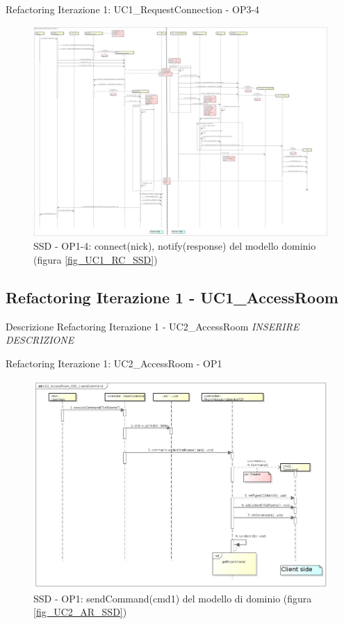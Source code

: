 \documentclass[t]{beamer} %
\begin{document}
\begin{frame} {Refactoring Iterazione 1: UC1\_RequestConnection - OP3-4}
   \begin{figure}
     \includegraphics[scale=0.068]{image_astah/Iteration_1_DesignModel_Refactored/UC1_RequestConnection_SSD_3_4_connect.png}{\centering}
     \caption{SSD - OP1-4: connect(nick), notify(response) del modello dominio (figura \ref{fig_UC1_RC_SSD}) }
     \label{fig_UC1_SSDR_RC_1_4} 
   \end{figure}
\end{frame}

\subsection{Refactoring Iterazione 1 - UC1\_AccessRoom}
\begin{frame} {Descrizione Refactoring Iterazione 1 - UC2\_AccessRoom }
 \emph{INSERIRE DESCRIZIONE}
\end{frame}

\begin{frame} {Refactoring Iterazione 1: UC2\_AccessRoom - OP1}
   \begin{figure}
     \includegraphics[scale=0.21]{image_astah/Iteration_1_DesignModel_Refactored/UC2_AccessRoom_SSD_1_sendCommand.png}{\centering}
     \caption{SSD - OP1: sendCommand(cmd1) del modello di dominio (figura \ref{fig_UC2_AR_SSD}) }
     \label{fig_UC2_SSDR_AC_1} 
   \end{figure}
\end{frame}
\end{document}
